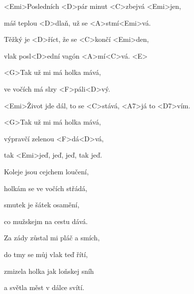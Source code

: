 

\zs
<Emi>Posledních <D>pár minut <C>zbejvá <Emi>jen,

máš teplou <D>dlaň, už se <A>stmí<Emi>vá.

Těžký je <D>říct, že se <C>končí <Emi>den,

vlak posl<D>ední vagón <A>mí<C>vá. <E>
\ks

\zr
<G>Tak už mi má holka mává,

ve vočích má slzy <F>páli<D>vý.

<Emi>Život jde dál, to se <C>stává, <A7>já to <D7>vím.

<G>Tak už mi má holka mává,

výpravčí zelenou <F>dá<D>vá,

tak <Emi>jeď, jeď, jeď, tak jeď.
\kr

\zs
Koleje jsou cejchem loučení,

holkám se ve vočích střádá,

smutek je šátek osamění,

co mužskejm na cestu dává.
\ks

\zr \kr

\zs
Za zády zůstal mi pláč a smích,

do tmy se můj vlak teď řítí,

zmizela holka jak loňskej sníh

a světla měst v dálce svítí.
\ks

\zr \kr

\kp





